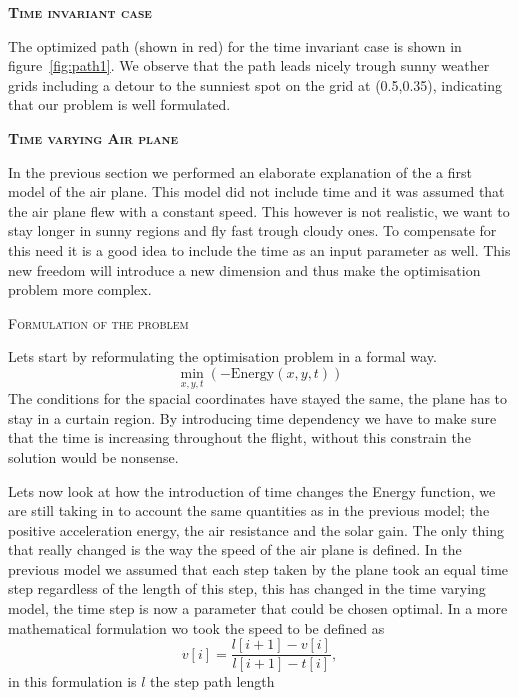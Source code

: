\documentclass[10pt,a4paper]{article}
\newenvironment{buik}
{\begin{multicols}{3}}
{\end{multicols}}
\renewcommand{\section}[1]{%
    \par\vspace{.3cm}\noindent\textbf{\textsc{#1}}%
    \par\noindent\ignorespaces%
}
\renewcommand{\subsection}[1]{%
    \par\vspace{.3cm}\noindent\textsc{#1}%
    \par\noindent\ignorespaces%
}
\begin{document}
\begin{buik}

\section{Time invariant case}
%
The optimized path (shown in red) for the time invariant case is shown in figure~\ref{fig:path1}. We observe that the path leads nicely trough sunny weather grids including a detour to the sunniest spot on the grid at (0.5,0.35), indicating that our problem is well formulated.




\section{Time varying Air plane}

In the previous section we performed an elaborate explanation of the a first model of the air plane.
This model did not include time  and it was assumed that the air plane flew with a constant speed.
This however is not realistic, we want to stay longer in sunny regions and fly fast trough cloudy ones.
To compensate for this need it is a good idea to include the time as an input parameter as well.
This new freedom will introduce a new dimension and thus make the optimisation problem more complex.

\subsection{Formulation of the problem}

Lets start by reformulating the optimisation problem in a formal way.
\begin{equation}
       \min_{x,y,t }( -\text{Energy}(x,y,t))
\end{equation}
The conditions for the spacial coordinates have stayed the same, the plane has to stay in a curtain region.
By introducing time dependency we have to make sure that the time is increasing throughout the flight, without this constrain the solution would be nonsense.

Lets now look at how the introduction of time changes the Energy function, we are still taking in to account the same quantities as in the previous model; the positive acceleration energy, the air resistance and the solar gain.
The only  thing that really changed is the way the speed of the air plane is defined.
In the previous model we assumed that each step taken by the plane took an equal time step regardless of the length of this step, this has changed in the time varying model, the time step is now a parameter that could be chosen optimal.
In a more mathematical formulation wo took the speed to be defined as
\begin{equation}
v[i] = \dfrac{l[i+1]-v[i]}{l[i+1]-t[i]},
\end{equation}
in this formulation is $ l $ the step path length 



\end{buik}
\end{document}
